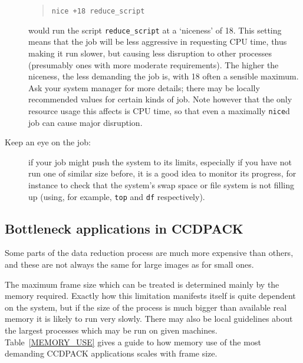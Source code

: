 \documentclass[twoside,11pt]{article}
\newcommand{\xlabel}[1]{}
\begin{document}
\begin{description}
  \begin{quote}
   {\tt nice +18 reduce\_script}
  \end{quote}

   would run the script {\tt reduce\_script} at a `niceness' of 18.
   This setting means that the job will be less aggressive in requesting
   CPU time, thus making it run slower, but causing less disruption to
   other processes (presumably ones with more moderate requirements).
   The higher the niceness, the less demanding the job is, with 18 often a
   sensible maximum.
   Ask your system manager for more details; there may be locally 
   recommended values for certain kinds of job.
   Note however that the only resource usage this affects is CPU time,
   so that even a maximally {\tt nice}d job can cause major disruption.

  \item[Keep an eye on the job:] if your job might push the system to its
   limits, especially if you have not run one of similar size before,
   it is a good idea to monitor its progress, for instance to check that
   the system's swap space or file system is not filling up 
   (using, for example, {\tt top} and {\tt df} respectively).

\end{description}

\subsection{\xlabel{LARGE-APPS}Bottleneck applications in CCDPACK}

Some parts of the data reduction process are much 
more expensive than others,
and these are not always the same for large images as for small ones. 

The maximum frame size which can be treated is 
determined mainly by the memory required.
Exactly how this limitation manifests itself is quite
dependent on the system, but if the size of the process is
much bigger than available real memory it is likely to run very slowly.  
There may also be local guidelines about the largest processes
which may be run on given machines. 
Table~\ref{MEMORY_USE} gives a guide to how memory use of the most demanding
CCDPACK applications scales with frame size.
\end{document}

